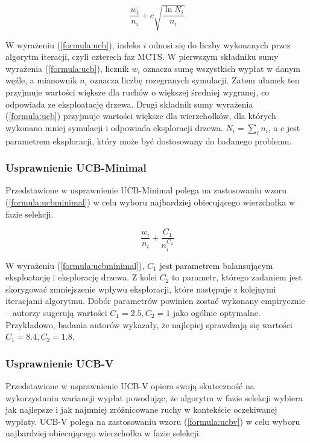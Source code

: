 \documentclass[a4paper,12pt]{article}
\begin{document}
\begin{equation}\label{formula:ucb}
\frac{w_i}{n_i} + c \sqrt{\frac{\ln N_i}{n_i}}
\end{equation}

W wyrażeniu (\ref{formula:ucb}), indeks $i$ odnosi się do liczby wykonanych przez algorytm iteracji, czyli czterech faz MCTS. W pierwszym składniku sumy wyrażenia (\ref{formula:ucb}), licznik $w_i$ oznacza sumę wszystkich wypłat w danym węźle, a mianownik $n_i$ oznacza liczbę rozegranych symulacji. Zatem ułamek ten przyjmuje wartości większe dla ruchów o większej średniej wygranej, co odpowiada ze eksploatację drzewa. Drugi składnik sumy wyrażenia (\ref{formula:ucb}) przyjmuje wartości większe dla wierzchołków, dla których wykonano mniej symulacji i odpowiada eksploracji drzewa. $N_i=\sum_i n_i$, a $c$ jest parametrem eksploracji, który może być dostosowany do badanego problemu.


\subsubsection{Usprawnienie UCB-Minimal}
Przedstawione w \cite{ucbminimal} usprawnienie UCB-Minimal polega na zastosowaniu wzoru (\ref{formula:ucbminimal}) w celu wyboru najbardziej obiecującego wierzchołka w fazie selekcji.

\begin{equation}\label{formula:ucbminimal}
\frac{w_i}{n_i} + \frac{C_1}{n_i^{C_2}}
\end{equation}

W wyrażeniu (\ref{formula:ucbminimal}), $C_1$ jest parametrem balansującym eksploatację i eksplorację drzewa. Z kolei $C_2$ to parametr, którego zadaniem jest skorygować zmniejszenie wpływu eksploracji, które następuje z kolejnymi iteracjami algorytmu. Dobór parametrów powinien zostać wykonany empirycznie -- autorzy \cite{ucbminimal} sugerują wartości $C_1=2.5, C_2 = 1$ jako ogólnie optymalne. Przykładowo, badania autorów \cite{tron} wykazały, że najlepiej sprawdzają się wartości $C_1 = 8.4, C_2 = 1.8$.

\subsubsection{Usprawnienie UCB-V} 
Przedstawione w \cite{ucbv} usprawnienie UCB-V opiera swoją skuteczność na wykorzystaniu wariancji wypłat powodując, że algorytm w fazie selekcji wybiera jak najlepsze i jak najmniej zróżnicowane ruchy w kontekście oczekiwanej wypłaty. UCB-V polega na zastosowaniu wzoru (\ref{formula:ucbv}) w celu wyboru najbardziej obiecującego wierzchołka w fazie selekcji.
\end{document}
